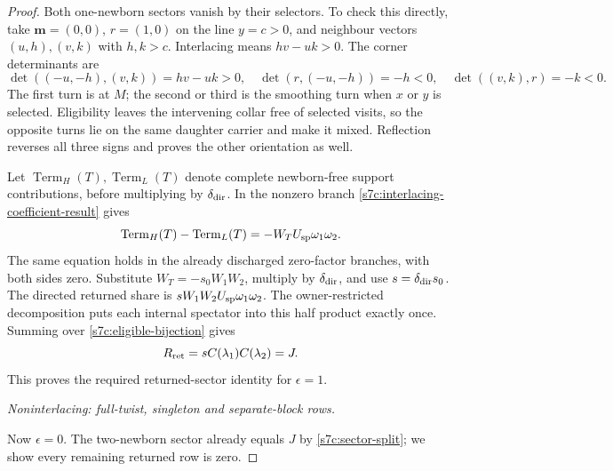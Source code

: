 \begin{proof}
Both one-newborn sectors vanish by their selectors.  To check this
directly, take $\mathbf m=(0,0)$, $r=(1,0)$ on the line $y=c>0$, and
neighbour vectors $(u,h),(v,k)$ with $h,k>c$.  Interlacing means
$hv-uk>0$.  The corner determinants are
\begin{equation}\label{s7c:one-newborn-turns}
 \det((-u,-h),(v,k))=hv-uk>0,\quad
 \det(r,(-u,-h))=-h<0,\quad
 \det((v,k),r)=-k<0.
\end{equation}
The first turn is at $M$; the second or third is the smoothing turn
when $x$ or $y$ is selected.  Eligibility leaves the intervening collar
free of selected visits, so the opposite turns lie on the same daughter
carrier and make it mixed.  Reflection reverses all three signs and
proves the other orientation as well.

Let $\operatorname{Term}_H(T),\operatorname{Term}_L(T)$ denote complete
newborn-free support contributions, before multiplying by
$\delta_{\rm dir}$.  In the nonzero branch
\eqref{s7c:interlacing-coefficient-result} gives
\begin{equation}\label{s7c:interlacing-term}
 \operatorname{Term}_H(T)-\operatorname{Term}_L(T)
 =-W_TU_{\rm sp}\omega_1\omega_2.
\end{equation}
The same equation holds in the already discharged zero-factor branches,
with both sides zero.  Substitute $W_T=-s_0W_1W_2$, multiply by
$\delta_{\rm dir}$, and use $s=\delta_{\rm dir}s_0$.
The directed returned share is
$sW_1W_2U_{\rm sp}\omega_1\omega_2$.  The owner-restricted
decomposition puts each internal spectator into this half product
exactly once.  Summing over \eqref{s7c:eligible-bijection} gives
\begin{equation}\label{s7c:interlacing-return}
 R_{\rm ret}=sC(\lambda_1)C(\lambda_2)=J.
\end{equation}
This proves the required returned-sector identity for $\epsilon=1$.

\par\medskip\noindent\emph{Noninterlacing: full-twist, singleton and separate-block rows.}\par

Now $\epsilon=0$.  The two-newborn sector already equals $J$ by
\eqref{s7c:sector-split}; we show every remaining returned row is zero.


\end{proof}
